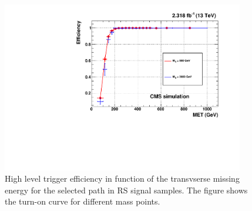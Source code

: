 \begin{figure}[!ht]
\begin{center}
  \includegraphics[width=300pt]{figures/trigger/triggerEffcompSignal.pdf}
\end{center}
\caption{High level trigger efficiency in function of the transvserse missing energy for the selected path in RS signal samples. The figure shows the turn-on curve for different mass points.}
\label{fig:TriggerSignal}
\end{figure}





